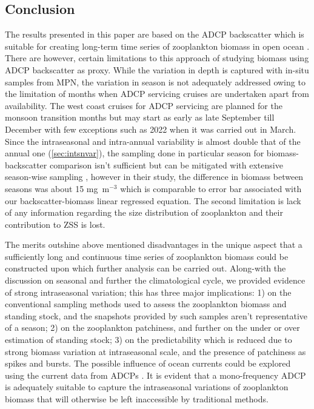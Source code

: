 \documentclass[authoryear,review,12pt]{elsarticle}
\begin{document}
	\subsection{Conclusion}
	The results presented in this paper are based on the ADCP backscatter which is suitable for creating long-term time series of zooplankton biomass in open ocean \citep{jiang2007temporal,hobbs2021marine,ursella2021diel,aparna2022seasonal}. There are however, certain limitations to this approach of studying biomass using ADCP backscatter as proxy. While the variation in depth is captured with in-situ samples from MPN, the variation in season is not adequately addressed owing to the limitation of months when ADCP servicing cruises are undertaken apart from availability. The west coast cruises for ADCP servicing are planned for the monsoon transition months but may start as early as late September till December with few exceptions such as 2022 when it was carried out in March. Since the intraseasonal and intra-annual variability is almost double that of the annual one (\cref{sec:intsnvar}), the sampling done in particular season for biomass-backscatter comparison isn't sufficient but can be mitigated with extensive season-wise sampling \citep{jadhav2024abundance}, however in their study, the difference in biomass between seasons was about 15 mg~m$^{-3}$ which is comparable to  error bar associated with our backscatter-biomass linear regressed equation. The second limitation is lack of any information regarding the size distribution of zooplankton and their contribution to ZSS is lost. 
	
	The merits outshine above mentioned disadvantages in the unique aspect that a sufficiently long and continuous time series of zooplankton biomass could be constructed upon which further analysis can be carried out. Along-with the discussion on seasonal and further the climatological cycle, we provided evidence of strong intraseasonal variation; this has three major implications: 1) on the conventional sampling methods used to assess the zooplankton biomass and standing stock, and the snapshots provided by such samples aren't representative of a season; 2) on the zooplankton patchiness, and further on the under or over estimation of standing stock; 3) on the predictability which is reduced due to strong biomass variation at intraseasonal scale, and the presence of patchiness as spikes and bursts. The possible influence of ocean currents could be explored using the current data from ADCPs \citep{hitchcock2002zooplankton,lawson2004acoustically}. It is evident that a mono-frequency ADCP is adequately suitable to capture the intraseasonal variations of  zooplankton biomass that will otherwise be left inaccessible by traditional methods. 
	
\end{document}
